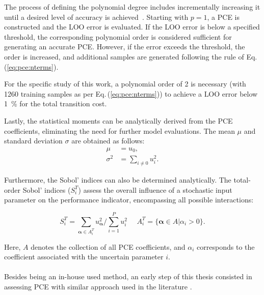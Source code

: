 The process of defining the polynomial degree includes incrementally increasing it until a desired level of accuracy is achieved~\cite{coppitters2022rheia}. Starting with $p=1$, a PCE is constructed and the \gls{LOO} error is evaluated. If the \gls{LOO} error is below a specified threshold, the corresponding polynomial order is considered sufficient for generating an accurate PCE. However, if the error exceeds the threshold, the order is increased, and additional samples are generated following the rule of Eq.\,(\ref{eq:pce:nterms}).

For the specific study of this work, a polynomial order of 2 is necessary (with 1260 training samples as per Eq.\,(\ref{eq:pce:nterms})) to achieve a \gls{LOO} error below \SI{1}{\%} for the total transition cost.

Lastly, the statistical moments can be analytically derived from the PCE coefficients, eliminating the need for further model evaluations. The mean $\mu$ and standard deviation $\sigma$ are obtained as follows:
\begin{align}
\mu &= u_0,\\
\sigma^2 &= \sum_{i \neq 0 } u_{i}^2 .
\label{eq:pce:statmom}
\end{align}

Furthermore, the Sobol' indices can also be determined analytically. The total-order Sobol' indices ($S_i^{T}$) assess the overall influence of a stochastic input parameter on the performance indicator, encompassing all possible interactions:

\begin{equation}
S_i^{T} = \sum_{\bm{\alpha} \in A_i^T}^{} u_{\bm{\alpha}}^2/\sum_{i=1}^P u_i^2 ~~~~~~ A_i^T = \{\bm{\alpha} \in A | \alpha_i > 0\}.
\end{equation}

Here, $A$ denotes the collection of all PCE coefficients, and $\alpha_i$ corresponds to the coefficient associated with the uncertain parameter $i$.\\

\\

\noindent
Besides being an in-house used method, an early step of this thesis consisted in assessing \gls{PCE} with similar approach used in the literature \cite{limpens2020impact}. 

